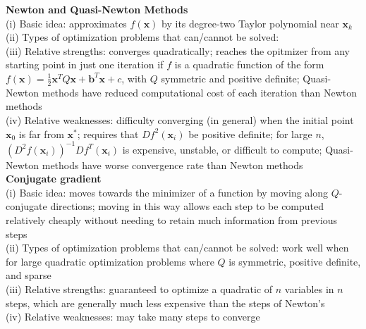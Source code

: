 \documentclass[letterpaper,12pt]{article}
\let\vec\mathbf
\theoremstyle{definition}
\begin{document}
\textbf{Newton and Quasi-Newton Methods} \\
(i) Basic idea: approximates $f(\vec{x})$ by its degree-two Taylor polynomial near $\vec{x}_k$\\
(ii) Types of optimization problems that can/cannot be solved: \\
(iii) Relative strengths: converges quadratically; reaches the opitmizer from any starting point in just one iteration if $f$ is a quadratic function of the form $f(\vec{x}) = \frac{1}{2}\vec{x}^TQ\vec{x} + \vec{b}^T\vec{x} + c$, with $Q$ symmetric and positive definite; Quasi-Newton methods have reduced computational cost of each iteration than Newton methods \\
(iv) Relative weaknesses: difficulty converging (in general) when the initial point $\vec{x}_0$ is far from $\vec{x}^*$; requires that $Df^2(\vec{x}_i)$ be positive definite; for large $n$, $(D^2f(\vec{x}_i))^{-1}Df^T(\vec{x}_i)$ is expensive, unstable, or difficult to compute; Quasi-Newton methods have worse convergence rate than Newton methods \\

\textbf{Conjugate gradient} \\
(i) Basic idea: moves towards the minimizer of a function by moving along $Q$-conjugate directions; moving in this way allows each step to be computed relatively cheaply without needing to retain much information from previous steps \\
(ii) Types of optimization problems that can/cannot be solved: work well when for large quadratic optimization problems where $Q$ is symmetric, positive definite, and sparse \\
(iii) Relative strengths: guaranteed to optimize a quadratic of $n$ variables in $n$ steps, which are generally much less expensive than the steps of Newton's \\
(iv) Relative weaknesses: may take many steps to converge \\
\end{document}
